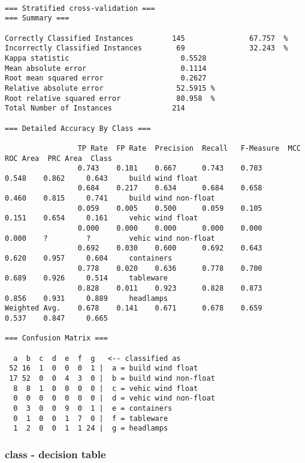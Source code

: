 \documentclass[a4paper]{article}
\begin{document}
\begin{verbatim}

=== Stratified cross-validation ===
=== Summary ===

Correctly Classified Instances         145               67.757  %
Incorrectly Classified Instances        69               32.243  %
Kappa statistic                          0.5528
Mean absolute error                      0.1114
Root mean squared error                  0.2627
Relative absolute error                 52.5915 %
Root relative squared error             80.958  %
Total Number of Instances              214

=== Detailed Accuracy By Class ===

                 TP Rate  FP Rate  Precision  Recall   F-Measure  MCC      ROC Area  PRC Area  Class
                 0.743    0.181    0.667      0.743    0.703      0.548    0.862     0.643     build wind float
                 0.684    0.217    0.634      0.684    0.658      0.460    0.815     0.741     build wind non-float
                 0.059    0.005    0.500      0.059    0.105      0.151    0.654     0.161     vehic wind float
                 0.000    0.000    0.000      0.000    0.000      0.000    ?         ?         vehic wind non-float
                 0.692    0.030    0.600      0.692    0.643      0.620    0.957     0.604     containers
                 0.778    0.020    0.636      0.778    0.700      0.689    0.926     0.514     tableware
                 0.828    0.011    0.923      0.828    0.873      0.856    0.931     0.889     headlamps
Weighted Avg.    0.678    0.141    0.671      0.678    0.659      0.537    0.847     0.665

=== Confusion Matrix ===

  a  b  c  d  e  f  g   <-- classified as
 52 16  1  0  0  0  1 |  a = build wind float
 17 52  0  0  4  3  0 |  b = build wind non-float
  8  8  1  0  0  0  0 |  c = vehic wind float
  0  0  0  0  0  0  0 |  d = vehic wind non-float
  0  3  0  0  9  0  1 |  e = containers
  0  1  0  0  1  7  0 |  f = tableware
  1  2  0  0  1  1 24 |  g = headlamps

\end{verbatim}

\subsubsection{class - decision table}
\end{document}
